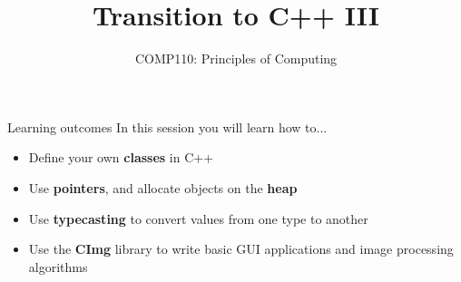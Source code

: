 \usepackage{../../beamerthemeFalmouthGamesAcademy}
\graphicspath{ {../../} }



\title{Transition to C++ III}   
\subtitle{COMP110: Principles of Computing}

\frame{\titlepage} 

\begin{frame}{Learning outcomes}
    In this session you will learn how to...
    \begin{itemize}
        \item Define your own \textbf{classes} in C++
        \item Use \textbf{pointers}, and allocate objects on the \textbf{heap}
        \item Use \textbf{typecasting} to convert values from one type to another
        \item Use the \textbf{CImg} library to write basic GUI applications and image processing algorithms
    \end{itemize}
\end{frame}







%


